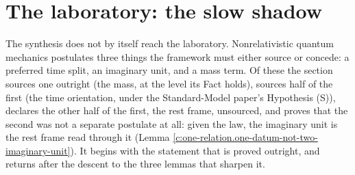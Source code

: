 \documentclass[11pt]{article}
\theoremstyle{definition}
\theoremstyle{plain}
\begin{document}
\section{The laboratory: the slow shadow}

\label{c:note.one-relation.setting-laboratory-slow-shadow}
The synthesis does not by itself reach the laboratory. Nonrelativistic quantum mechanics postulates three things the framework must either source or concede: a preferred time split, an imaginary unit, and a mass term. Of these the section sources one outright (the mass, at the level its Fact holds), sources half of the first (the time orientation, under the Standard-Model paper's Hypothesis (S)), declares the other half of the first, the rest frame, unsourced, and proves that the second was not a separate postulate at all: given the law, the imaginary unit is the rest frame read through it (Lemma \ref{c:one-relation.one-datum-not-two-imaginary-unit}). It begins with the statement that is proved outright, and returns after the descent to the three lemmas that sharpen it.
\end{document}
